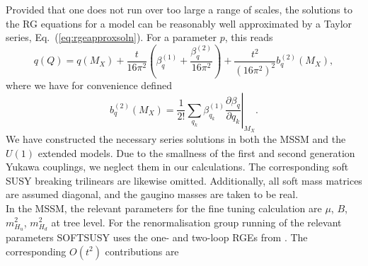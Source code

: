 \documentclass[preprint,amsmath,amssymb,aps,superscriptaddress,prd,showpacs,floatfix,nofootinbib]{revtex4-1}
\begin{document}
Provided that one does not run over too large a range of scales, the
solutions to the RG equations for a model can be reasonably well
approximated by a Taylor series, Eq.~(\ref{eq:rgeapproxsoln}).  For a
parameter $p$, this reads
\begin{equation*}
q(Q)=q(M_X)+\frac{t}{16\pi^2}\left ( \beta_q^{(1)}+\frac{\beta_q^{(2)}}{16\pi^2}\right )+\frac{t^2}{(16\pi^2)^2}b_q^{(2)}(M_X),
\end{equation*}
where we have for convenience defined
\begin{equation*}
b_q^{(2)}(M_X)=\frac{1}{2!}\left . \sum_{q_k}\beta_{q_k}^{(1)}\frac{\partial \beta_q}{\partial q_k}\right |_{M_X}.
\end{equation*}
We have constructed the necessary series solutions in both the MSSM
and the $U(1)$ extended models. Due to the smallness of the first and
second generation Yukawa couplings, we neglect them in our
calculations. The corresponding soft SUSY breaking trilinears are
likewise omitted. Additionally, all soft mass matrices are assumed
diagonal, and the gaugino masses are taken to be real.\\
In the
MSSM, the relevant parameters for the fine tuning calculation are
$\mu$, $B$, $m_{H_u}^2$, $m_{H_d}^2$ at tree level. For the
renormalisation group running of the relevant parameters
SOFTSUSY uses the one- and two-loop RGEs from
\cite{Barger:1993gh,Martin:1993zk}. The corresponding $O(t^2)$
contributions are
\end{document}

